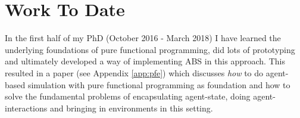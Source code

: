 \chapter{Work To Date}
\label{chap:work_to_date}


In the first half of my PhD (October 2016 - March 2018) I have learned the underlying foundations of pure functional programming, did lots of prototyping and ultimately developed a way of implementing ABS in this approach. This resulted in a paper (see Appendix \ref{app:pfe}) which discusses \textit{how} to do agent-based simulation with pure functional programming as foundation and how to solve the fundamental problems of encapsulating agent-state, doing agent-interactions and bringing in environments in this setting.

%	
%
%
%
%
%
%
%
%
%

